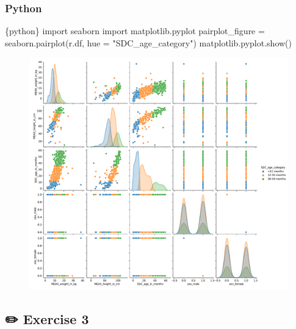 \documentclass[
  letterpaper,
  DIV=11,
  numbers=noendperiod,
  oneside]{scrreprt}
\newenvironment{Shaded}{\begin{snugshade}}{\end{snugshade}}
\newcommand{\ImportTok}[1]{\textcolor[rgb]{0.00,0.46,0.62}{#1}}
\newcommand{\InformationTok}[1]{\textcolor[rgb]{0.37,0.37,0.37}{#1}}
\newcommand{\NormalTok}[1]{\textcolor[rgb]{0.00,0.23,0.31}{#1}}
\newcommand{\OperatorTok}[1]{\textcolor[rgb]{0.37,0.37,0.37}{#1}}
\newcommand{\StringTok}[1]{\textcolor[rgb]{0.13,0.47,0.30}{#1}}
\begin{document}
\subsubsection{Python}

\begin{Shaded}
\begin{Highlighting}[]
\InformationTok{\textasciigrave{}\textasciigrave{}\textasciigrave{}\{python\}}
\ImportTok{import}\NormalTok{ seaborn}
\ImportTok{import}\NormalTok{ matplotlib.pyplot}
\NormalTok{pairplot\_figure }\OperatorTok{=}\NormalTok{ seaborn.pairplot(r.df, hue }\OperatorTok{=} \StringTok{"SDC\_age\_category"}\NormalTok{)}
\NormalTok{matplotlib.pyplot.show()}
\InformationTok{\textasciigrave{}\textasciigrave{}\textasciigrave{}}
\end{Highlighting}
\end{Shaded}

\begin{figure}[H]

{\centering \includegraphics{ds4ph_day3_session01_practical_session_files/figure-pdf/unnamed-chunk-15-1.pdf}

}

\end{figure}

\subsection{\texorpdfstring{{✏️} Exercise 3}{✏️ Exercise 3}}
\end{document}

